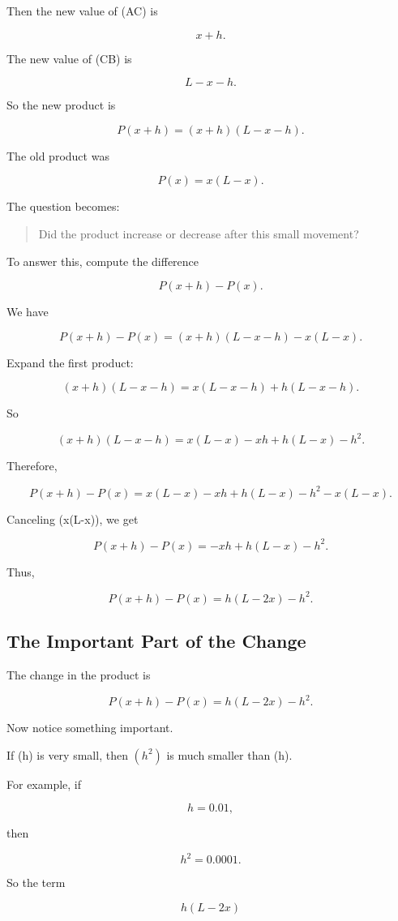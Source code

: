 Then the new value of (AC) is

\[
x+h.
\]

The new value of (CB) is

\[
L-x-h.
\]

So the new product is

\[
P(x+h)=(x+h)(L-x-h).
\]

The old product was

\[
P(x)=x(L-x).
\]

The question becomes:

\begin{quote}
Did the product increase or decrease after this small movement?
\end{quote}

To answer this, compute the difference

\[
P(x+h)-P(x).
\]

We have

\[
P(x+h)-P(x) = (x+h)(L-x-h)-x(L-x).
\]

Expand the first product:

\[
(x+h)(L-x-h) = x(L-x-h)+h(L-x-h).
\]

So

\[
(x+h)(L-x-h) = x(L-x)-xh+h(L-x)-h^2.
\]

Therefore,

\[
P(x+h)-P(x) = x(L-x)-xh+h(L-x)-h^2-x(L-x).
\]

Canceling (x(L-x)), we get

\[
P(x+h)-P(x) = -xh+h(L-x)-h^2.
\]

Thus,

\[
P(x+h)-P(x) = h(L-2x)-h^2.
\]

\subsection{The Important Part of the Change}

The change in the product is

\[
P(x+h)-P(x) = h(L-2x)-h^2.
\]

Now notice something important.

If (h) is very small, then $(h^2)$ is much smaller than (h).

For example, if

\[
h=0.01,
\]

then

\[
h^2=0.0001.
\]

So the term

\[
h(L-2x)
\]


